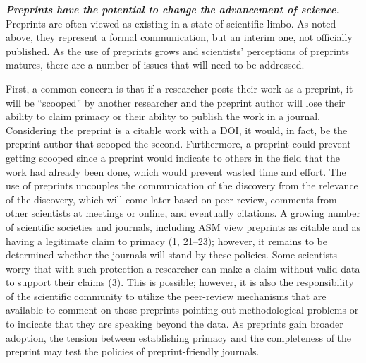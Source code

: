 \documentclass[11pt,]{article}
\begin{document}
\textbf{\emph{Preprints have the potential to change the advancement of
science.}} Preprints are often viewed as existing in a state of
scientific limbo. As noted above, they represent a formal communication,
but an interim one, not officially published. As the use of preprints
grows and scientists' perceptions of preprints matures, there are a
number of issues that will need to be addressed.

First, a common concern is that if a researcher posts their work as a
preprint, it will be ``scooped'' by another researcher and the preprint
author will lose their ability to claim primacy or their ability to
publish the work in a journal. Considering the preprint is a citable
work with a DOI, it would, in fact, be the preprint author that scooped
the second. Furthermore, a preprint could prevent getting scooped since
a preprint would indicate to others in the field that the work had
already been done, which would prevent wasted time and effort. The use
of preprints uncouples the communication of the discovery from the
relevance of the discovery, which will come later based on peer-review,
comments from other scientists at meetings or online, and eventually
citations. A growing number of scientific societies and journals,
including ASM view preprints as citable and as having a legitimate claim
to primacy (1, 21--23); however, it remains to be determined whether the
journals will stand by these policies. Some scientists worry that with
such protection a researcher can make a claim without valid data to
support their claims (3). This is possible; however, it is also the
responsibility of the scientific community to utilize the peer-review
mechanisms that are available to comment on those preprints pointing out
methodological problems or to indicate that they are speaking beyond the
data. As preprints gain broader adoption, the tension between
establishing primacy and the completeness of the preprint may test the
policies of preprint-friendly journals.
\end{document}

